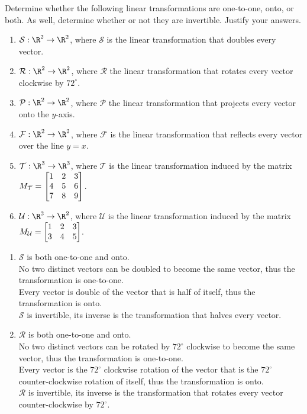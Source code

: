 \begin{exercises}
	\begin{problist}
		\prob Determine whether the following linear transformations are
		one-to-one, onto, or both. As well, determine whether or not they are
		invertible. Justify your answers.
		\begin{enumerate}
			\item $\mathcal S:\R^{2}\to\R^{2}$, where $\mathcal S$
				is the linear transformation that doubles every
				vector.

			\item $\mathcal R:\R^{2}\to\R^{2}$, where $\mathcal R$
				the linear transformation that rotates every
				vector clockwise by $72^{\circ}$.

			\item $\mathcal P:\R^{2}\to\R^{2}$, where $\mathcal P$
				the linear transformation that projects every
				vector onto the $y$-axis.

			\item $\mathcal F:\R^{2}\to\R^{2}$, where $\mathcal F$
				is the linear transformation that reflects every
				vector over the line $y=x$.

			\item $\mathcal T:\R^{3}\to\R^{3}$, where $\mathcal T$ is the linear
				transformation induced by the matrix
				$M_{\mathcal T} = \mat{1&2&3\\4&5&6\\7&8&9}$.

			\item $\mathcal U:\R^{3}\to\R^{2}$, where $\mathcal U$ is the linear
				transformation induced by the matrix
				$M_{\mathcal U} = \mat{1&2&3\\3&4&5}$.
		\end{enumerate}

		\begin{solution}
	    \begin{enumerate}
				\item
				$\mathcal S$ is both one-to-one and onto.\\
				No two distinct vectors can be doubled to become the same vector,
				thus the transformation is one-to-one.\\
				Every vector is double of the vector that is half of itself,
				thus the transformation is onto.\\
				$\mathcal S$ is invertible, its inverse is the transformation that
				halves every vector.

				\item
				$\mathcal R$ is both one-to-one and onto.\\
				No two distinct vectors can be rotated by $72^{\circ}$ clockwise to
				become the same vector,
				thus the transformation is one-to-one.\\
				Every vector is the $72^{\circ}$ clockwise rotation of the vector that
				is the $72^{\circ}$ counter-clockwise rotation of itself,
				thus the transformation is onto.\\
				$\mathcal R$ is invertible, its inverse is the transformation that
				rotates every vector counter-clockwise by $72^{\circ}$.


\end{enumerate}
\end{solution}
\end{problist}
\end{exercises}
